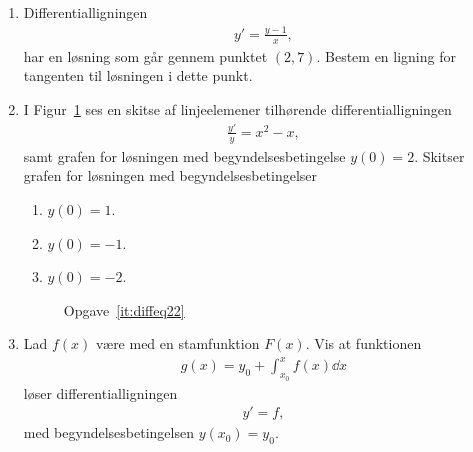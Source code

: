 \begin{enumerate}
	
	\item Differentialligningen
	\begin{align*}
	y'=\frac{y-1}{x},
	\end{align*}
	har en løsning som går gennem punktet $(2,7)$. Bestem en ligning for tangenten til løsningen i dette punkt.
	
	\item \label{it:diffeq22}	 I Figur~\ref{fig:diffeq22} ses en skitse af linjeelemener tilhørende differentialligningen
	\begin{align*}
	\frac{y'}{y}=x^2-x,
	\end{align*}
	samt grafen for løsningen med begyndelsesbetingelse $y(0)=2$. Skitser grafen for løsningen med begyndelsesbetingelser
	\begin{enumerate}
		\item $y(0)=1$.
		\item $y(0)=-1$.
		\item $y(0)=-2$.
	\end{enumerate}
	
	
	\begin{figure}
		\centering
		\caption{Opgave~\ref{it:diffeq22}}
		\label{fig:diffeq22}
	\end{figure}
	
	
	
	\item Lad $f(x)$ være med en stamfunktion $F(x)$. Vis at funktionen 
	\begin{align*}
	g(x)=y_0+\int_{x_0}^x f(x)\dd x
	\end{align*}
	løser differentialligningen 
	\begin{align*}
	y'=f,
	\end{align*}
	med begyndelsesbetingelsen $y(x_0)=y_0$.
	
	
	
	
	
	
	
	
	
\end{enumerate}